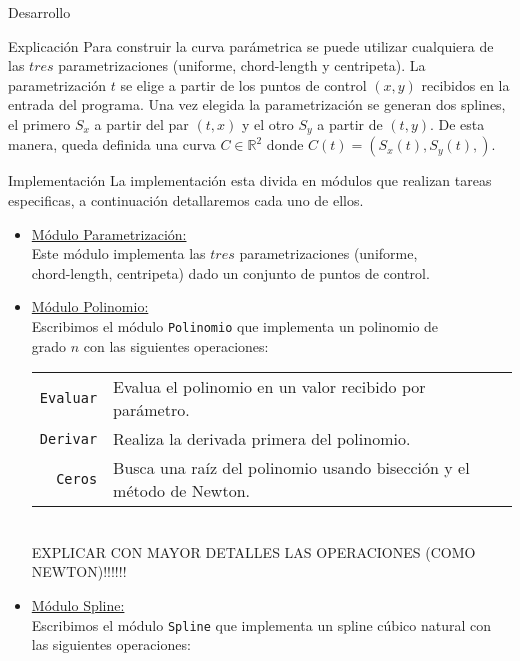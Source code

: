 \begin{section}{Desarrollo}
	\begin{subsection}{Explicación}
		Para construir la curva parámetrica se puede utilizar cualquiera de las $tres$ parametrizaciones (uniforme, chord-length y centripeta).
		La parametrización $t$ se elige a partir de los puntos de control $(x,y)$ recibidos en la entrada del programa.
		Una vez elegida la parametrización se generan dos splines, el primero $S_x$ a partir del par $(t,x)$ y el otro $S_y$ a partir de $(t,y)$.
		De esta manera, queda definida una curva $C \in \mathbb{R}^2$ donde $C(t) = (S_x(t),S_y(t),)$.
		
		
	\end{subsection}
	\begin{subsection}{Implementación}
		La implementación esta divida en módulos que realizan tareas especificas, a continuación detallaremos cada uno de ellos.
		
		\begin{itemize}
			\item \underline{Módulo Parametrización:}\\
				Este módulo implementa las $tres$ parametrizaciones (uniforme,\\
				chord-length, centripeta) dado un conjunto de puntos de control.
			\item \underline{Módulo Polinomio:}\\
				Escribimos el módulo \texttt{Polinomio} que implementa un polinomio de\\
				grado $n$ con las siguientes operaciones:\\
				
				\begin{tabular}{rl}
					\texttt{Evaluar} & Evalua el polinomio en un valor recibido por parámetro.\\
					\texttt{Derivar} & Realiza la derivada primera del polinomio.\\
					\texttt{Ceros}   & Busca una raíz del polinomio usando bisección y el método de Newton.\\
				\end{tabular}\\
				EXPLICAR CON MAYOR DETALLES LAS OPERACIONES (COMO NEWTON)!!!!!!
		
			\item \underline{Módulo Spline:}\\
				Escribimos el módulo \texttt{Spline} que implementa un spline cúbico natural con las siguientes operaciones:\\
				

\end{itemize}
\end{subsection}
\end{section}
